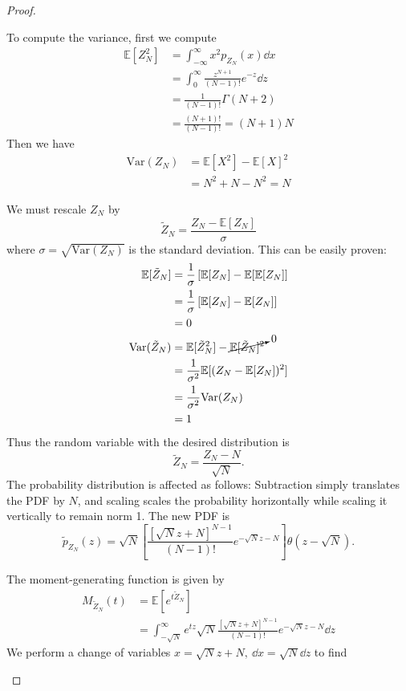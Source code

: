 \begin{proof}
\begin{parts}
		To compute the variance, first we compute
\begin{align*}
	\mathbb{E}[Z_N^2] &= \int_{-\infty}^\infty x^2 p_{Z_N}(x) \dd{x}\\
			&= \int_0^\infty \frac{z^{N+1}}{(N-1)!}e^{-z}\dd{z} \\
			&= \frac{1}{(N-1)!}\Gamma(N+2) \\
			&= \frac{(N+1)!}{(N-1)!}=(N+1)N 
\end{align*}
Then we have
\begin{align*}
\text{Var}(Z_N) &= \mathbb{E}[X^2]-\mathbb{E}[X]^2 \\
	&= N^2 + N - N^2 = N 
\end{align*}
\item We must rescale $Z_N$ by
	\[
		\tilde{Z}_N = \frac{Z_N - \mathbb{E}[Z_N]}{\sigma}
	\] 
	where $\sigma=\sqrt{\text{Var}(Z_N)} $ is the standard deviation. This can be easily proven:
	\begin{align*}
		\mathbb{E}[\tilde{Z}_N] &= \frac{1}{\sigma}\left[ \mathbb{E}[Z_N] - \mathbb{E}[\mathbb{E}[Z_N] \right]  \\
					&= \frac{1}{\sigma}\left[ \mathbb{E}[Z_N]-\mathbb{E}[Z_N] \right]  \\
					&= 0 \\
	\text{Var}(\tilde{Z}_N) &= \mathbb{E}[\tilde{Z}_N^2] - \cancelto{0}{\mathbb{E}[\tilde{Z}_N]^2} \\
				&= \frac{1}{\sigma^2}\mathbb{E}[(Z_N-\mathbb{E}[Z_N])^2] \\
				&= \frac{1}{\sigma^2}\text{Var}(Z_N)\\
				&= 1
	\end{align*}
	Thus the random variable with the desired distribution is
	\[
		\tilde{Z}_N = \frac{Z_N - N}{\sqrt{N} }
	.\] 
	The probability distribution is affected as follows: Subtraction simply translates the PDF by $N$, and scaling scales the probability horizontally while scaling it vertically to remain norm 1. The new PDF is
	\[
		\tilde{p}_{Z_N}(z) = \sqrt{N}\left[ \frac{[\sqrt{N} z+N]^{N-1}}{(N-1)!}e^{-\sqrt{N} z-N} \right] \theta(z-\sqrt{N})
	.\] 
\item The moment-generating function is given by
	\begin{align*}
		M_{\tilde{Z}_N}(t)&= \mathbb{E}[e^{t\tilde{Z}_N}] \\
				  &= \int_{-\sqrt{N}}^\infty e^{tz} \sqrt{N} \frac{[\sqrt{N} z + N]^{N-1}}{(N-1)!}e^{-\sqrt{N} z-N} \dd{z}
	\end{align*}
	We perform a change of variables $x=\sqrt{N} z + N,~\dd{x}=\sqrt{N} \dd{z}$ to find

\end{parts}
\end{proof}
